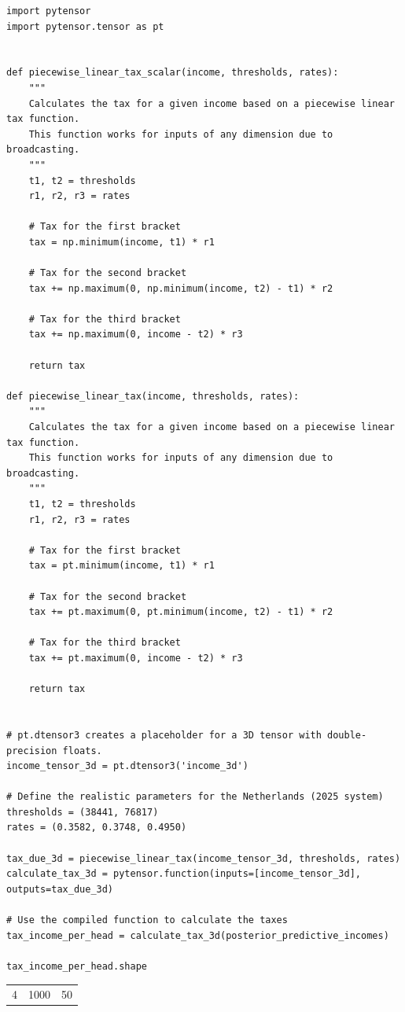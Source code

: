 \documentclass[11pt]{article}
\begin{document}
\begin{verbatim}
import pytensor
import pytensor.tensor as pt


def piecewise_linear_tax_scalar(income, thresholds, rates):
    """
    Calculates the tax for a given income based on a piecewise linear tax function.
    This function works for inputs of any dimension due to broadcasting.
    """
    t1, t2 = thresholds
    r1, r2, r3 = rates

    # Tax for the first bracket
    tax = np.minimum(income, t1) * r1

    # Tax for the second bracket
    tax += np.maximum(0, np.minimum(income, t2) - t1) * r2

    # Tax for the third bracket
    tax += np.maximum(0, income - t2) * r3

    return tax

def piecewise_linear_tax(income, thresholds, rates):
    """
    Calculates the tax for a given income based on a piecewise linear tax function.
    This function works for inputs of any dimension due to broadcasting.
    """
    t1, t2 = thresholds
    r1, r2, r3 = rates

    # Tax for the first bracket
    tax = pt.minimum(income, t1) * r1

    # Tax for the second bracket
    tax += pt.maximum(0, pt.minimum(income, t2) - t1) * r2

    # Tax for the third bracket
    tax += pt.maximum(0, income - t2) * r3

    return tax


# pt.dtensor3 creates a placeholder for a 3D tensor with double-precision floats.
income_tensor_3d = pt.dtensor3('income_3d')

# Define the realistic parameters for the Netherlands (2025 system)
thresholds = (38441, 76817)
rates = (0.3582, 0.3748, 0.4950)

tax_due_3d = piecewise_linear_tax(income_tensor_3d, thresholds, rates)
calculate_tax_3d = pytensor.function(inputs=[income_tensor_3d], outputs=tax_due_3d)

# Use the compiled function to calculate the taxes
tax_income_per_head = calculate_tax_3d(posterior_predictive_incomes)

tax_income_per_head.shape
\end{verbatim}

\begin{table}[htbp]
\label{}
\centering
\begin{tabular}{rrr}
4 & 1000 & 50\\
\end{tabular}
\end{table}
\end{document}
